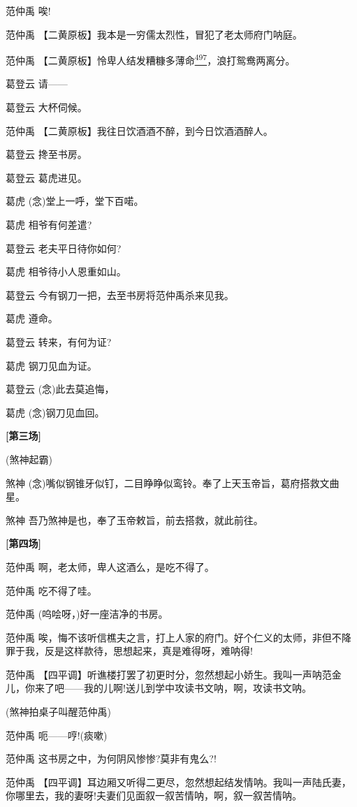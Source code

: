 范仲禹 唉!

范仲禹 【二黄原板】我本是一穷儒太烈性，冒犯了老太师府门呐庭。

范仲禹
【二黄原板】怜卑人结发糟糠多薄命\protect\hyperlink{fn497}{\textsuperscript{497}}，浪打鸳鸯两离分。

葛登云 请------

葛登云 大杯伺候。

范仲禹 【二黄原板】我往日饮酒酒不醉，到今日饮酒酒醉人。

葛登云 搀至书房。

葛登云 葛虎进见。

葛虎 (念)堂上一呼，堂下百喏。

葛虎 相爷有何差遣?

葛登云 老夫平日待你如何?

葛虎 相爷待小人恩重如山。

葛登云 今有钢刀一把，去至书房将范仲禹杀来见我。

葛虎 遵命。

葛登云 转来，有何为证?

葛虎 钢刀见血为证。

葛登云 (念)此去莫追悔，

葛虎 (念)钢刀见血回。

\textbf{{[}第三场{]}}

(煞神起霸)

煞神
(念)嘴似钢锥牙似钉，二目睁睁似鸾铃。奉了上天玉帝旨，葛府搭救文曲星。

煞神 吾乃煞神是也，奉了玉帝敕旨，前去搭救，就此前往。

\textbf{{[}第四场{]}}

范仲禹 啊，老太师，卑人这酒么，是吃不得了。

范仲禹 吃不得了哇。

范仲禹 (呜哙呀，)好一座洁净的书房。

范仲禹
唉，悔不该听信樵夫之言，打上人家的府门。好个仁义的太师，非但不降罪于我，反是这样款待，思想起来，真是难得呀，难呐得!

范仲禹
【四平调】听谯楼打罢了初更时分，忽然想起小娇生。我叫一声呐范金儿，你来了吧------我的儿啊!送儿到学中攻读书文呐，啊，攻读书文呐。

(煞神拍桌子叫醒范仲禹)

范仲禹 呃------哼!(痰嗽)

范仲禹 这书房之中，为何阴风惨惨?莫非有鬼么?!

范仲禹
【四平调】耳边厢又听得二更尽，忽然想起结发情呐。我叫一声陆氏妻，你哪里去，我的妻呀!夫妻们见面叙一叙苦情呐，啊，叙一叙苦情呐。

